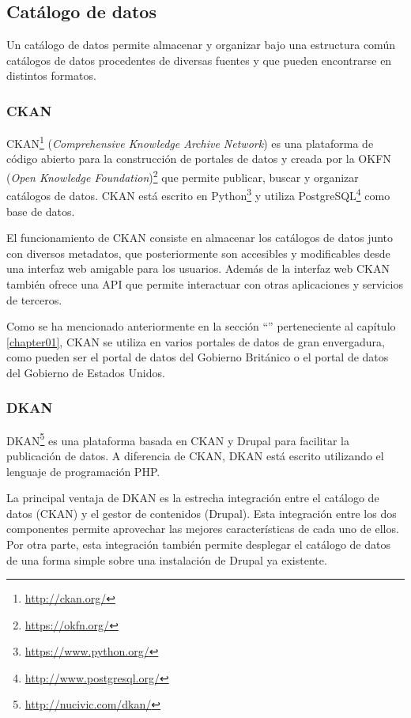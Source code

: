 \subsection{Catálogo de datos}
Un catálogo de datos permite almacenar y organizar bajo una estructura común catálogos de datos procedentes de diversas fuentes y que pueden encontrarse en distintos formatos.


\subsubsection{CKAN}
CKAN\footnote{\url{http://ckan.org/}} (\textit{Comprehensive Knowledge Archive Network}) es una plataforma de código abierto para la construcción de portales de datos y creada por la OKFN (\textit{Open Knowledge Foundation})\footnote{\url{https://okfn.org/}} que permite publicar, buscar y organizar catálogos de datos. CKAN está escrito en Python\footnote{\url{https://www.python.org/}} y utiliza PostgreSQL\footnote{\url{http://www.postgresql.org/}} como base de datos.

El funcionamiento de CKAN consiste en almacenar los catálogos de datos junto con diversos metadatos, que posteriormente son accesibles y modificables desde una interfaz web amigable para los usuarios.  Además de la interfaz web CKAN también ofrece una API que permite interactuar con otras aplicaciones y servicios de terceros.

Como se ha mencionado anteriormente en la sección ``'' perteneciente al capítulo \ref{chapter01}, CKAN se utiliza en varios portales de datos de gran envergadura, como pueden ser el portal de datos del Gobierno Británico o el portal de datos del Gobierno de Estados Unidos.


\subsubsection{DKAN}
DKAN\footnote{\url{http://nucivic.com/dkan/}} es una plataforma basada en CKAN y Drupal para facilitar la publicación de datos.  A diferencia de CKAN, DKAN está escrito utilizando el lenguaje de programación PHP.

La principal ventaja de DKAN es la estrecha integración entre el catálogo de datos (CKAN) y el gestor de contenidos (Drupal).  Esta integración entre los dos componentes permite aprovechar las mejores características de cada uno de ellos.  Por otra parte, esta integración también permite desplegar el catálogo de datos de una forma simple sobre una instalación de Drupal ya existente.

